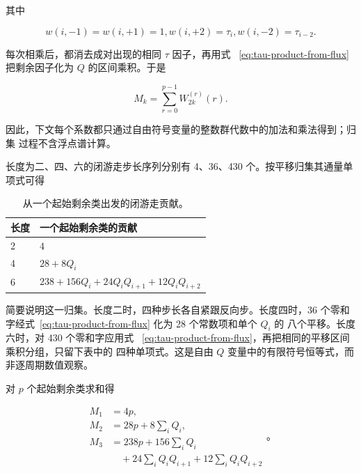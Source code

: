 其中

\begin{equation}
w(i,-1)=w(i,+1)=1,   w(i,+2)=\tau_i,   w(i,-2)=\tau_{i-2}.
\end{equation}

每次相乘后，都消去成对出现的相同 \(\tau\) 因子，再用式~
\eqref{eq:tau-product-from-flux} 把剩余因子化为 \(Q\) 的区间乘积。于是

\begin{equation}
\label{eq:walk-moment}
M_k=\sum_{r=0}^{p-1} W_{2k}^{(r)}(r).
\end{equation}

因此，下文每个系数都只通过自由符号变量的整数群代数中的加法和乘法得到；归集
过程不含浮点谱计算。

长度为二、四、六的闭游走步长序列分别有 4、36、430 个。按平移归集其通量单项式可得

\begin{table}[tbp]
\centering
\caption{从一个起始剩余类出发的闭游走贡献。}
\label{tab:closed-walk-contributions}
\begingroup
\renewcommand{\arraystretch}{1.12}
\begin{tabular}{ll}
\toprule
长度 & 一个起始剩余类的贡献 \\
\midrule
2 & \(4\) \\
4 & \(28+8Q_i\) \\
6 & \(238+156Q_i+24Q_iQ_{i+1}+12Q_iQ_{i+2}\) \\
\bottomrule
\end{tabular}
\endgroup
\end{table}

简要说明这一归集。长度二时，四种步长各自紧跟反向步。长度四时，36 个零和
字经式~\eqref{eq:tau-product-from-flux} 化为 28 个常数项和单个 \(Q_i\) 的
八个平移。长度六时，对 430 个零和字应用式~
\eqref{eq:tau-product-from-flux}，再把相同的平移区间乘积分组，只留下表中的
四种单项式。这是自由 \(Q\) 变量中的有限符号恒等式，而非逐周期数值观察。

对 \(p\) 个起始剩余类求和得

\begin{equation}
\label{eq:general-flux-moments}
\begin{aligned}
M_{1}&=4p, \\
M_{2}&=28p+8 \sum_i Q_i, \\
M_{3}&=238p+156 \sum_i Q_i \\
&\quad +24 \sum_i Q_iQ_{i+1}+12 \sum_i Q_iQ_{i+2}
\end{aligned}
\text{。}
\end{equation}

